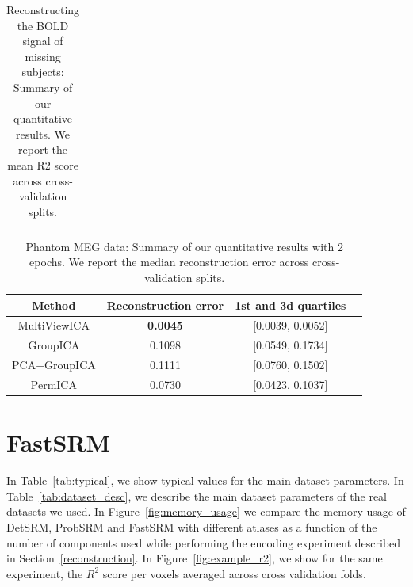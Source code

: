 \documentclass{report}
\begin{document}
{\begin{table}
\begin{tabular}{|c|c | c | c|}
         
    \end{tabular}
    \caption{Reconstructing the BOLD signal of missing subjects: Summary of our quantitative results. We report the mean R2 score across cross-validation splits.}
    \label{tab:recon}
\end{table}

\begin{table}
    \centering
    \begin{tabular}{|c|c|c|c}
    \hline
         \textbf{Method} & \textbf{Reconstruction error} & \textbf{1st and 3d quartiles} 
         \\
         \hline
         MultiViewICA & \textbf{0.0045} & [0.0039, 0.0052] \\ 
GroupICA & 0.1098 & [0.0549, 0.1734] \\ 
PCA+GroupICA & 0.1111 & [0.0760, 0.1502] \\ 
PermICA & 0.0730 & [0.0423, 0.1037] \\ 
\hline
    \end{tabular}
    \caption{Phantom MEG data: Summary of our quantitative results with 2 epochs. We report the median reconstruction error across cross-validation splits.}
    \label{tab:meg}
\end{table}


\chapter{FastSRM}
In Table~\ref{tab:typical}, we show typical values for the main dataset parameters. In Table~\ref{tab:dataset_desc}, we describe the main dataset parameters of the real datasets we used. In Figure~\ref{fig:memory_usage} we compare the memory usage of DetSRM, ProbSRM and FastSRM with different atlases as a function of the number of components used while performing the encoding experiment described in Section~\ref{reconstruction}. In Figure~\ref{fig:example_r2}, we show for the same experiment, the $R^2$ score per voxels averaged across cross validation folds. 


}
\end{document}
